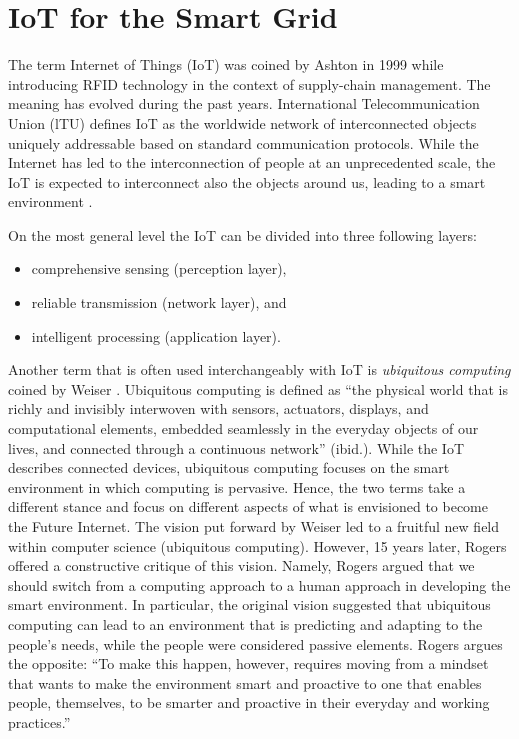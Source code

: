 \section{IoT for the Smart Grid}
\label{sec:IoTSG}
The term Internet of Things (IoT) was coined by Ashton in 1999 \cite{ashton2011internet} while introducing RFID technology in the context of supply-chain management. The meaning has evolved during the past years. International Telecommunication Union (lTU) defines IoT as the worldwide network of interconnected objects uniquely addressable based on standard communication protocols. While the Internet has led to the interconnection of people at an unprecedented scale, the IoT is expected to interconnect also the objects around us, leading to a smart environment \cite{gubbi2013internet}.	

On the most general level the IoT can be divided into three following layers:
\begin{itemize}
\item comprehensive sensing (perception layer),
\item reliable transmission (network layer), and
\item intelligent processing (application layer).
\end{itemize}
	
Another term that is often used interchangeably with IoT is \textit{ubiquitous computing} coined by Weiser \cite{weiser1991computer}. Ubiquitous computing is defined as ``the physical world that is richly and invisibly interwoven with sensors, actuators, displays, and computational elements, embedded seamlessly in the everyday objects of our lives, and connected through a continuous network'' (ibid.). While the IoT describes connected devices, ubiquitous computing focuses on the smart environment in which computing is pervasive. Hence, the two terms take a different stance and focus on different aspects of what is envisioned to become the Future Internet. 
The vision put forward by Weiser \cite{weiser1991computer} led to a fruitful new field within computer science (ubiquitous computing). However, 15 years later, Rogers \cite{rogers2006moving} offered a constructive critique of this vision. Namely, Rogers argued that we should switch from a computing approach to a human approach in developing the smart environment. In particular, the original vision suggested that ubiquitous computing can lead to an environment that is predicting and adapting to the people's needs, while the people were considered passive elements. Rogers argues the opposite: ``To make this happen, however, requires moving from a mindset that wants to make the  environment smart and proactive to one that enables people, themselves, to be smarter and proactive in their everyday and working practices.''

